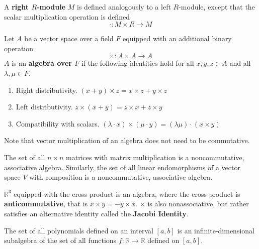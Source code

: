   \begin{definition}
    A \textbf{right $R$-module} $M$ is defined analogously to a left $R$-module, except that the scalar multiplication operation is defined
    \begin{equation}
      \cdot: M \times R \longrightarrow M
    \end{equation}
  \end{definition}

  \begin{definition}
    Let $A$ be a vector space over a field $F$ equipped with an additional binary operation 
    \begin{equation}
      \times: A \times A \longrightarrow A
    \end{equation}
    $A$ is an \textbf{algebra over $F$} if the following identities hold for all $x, y, z \in A$ and all $\lambda, \mu \in F$. 
    \begin{enumerate}
      \item Right distributivity. $(x + y) \times z = x \times z + y \times z$ 
      \item Left distributivity. $z \times (x + y) = z \times x + z \times y$
      \item Compatibility with scalars. $(\lambda \cdot x ) \times (\mu \cdot y) = (\lambda \mu) \cdot (x \times y)$ 
    \end{enumerate}
  \end{definition}

  Note that vector multiplication of an algebra does not need to be commutative. 

  \begin{example}
    The set of all $n \times n$ matrices with matrix multiplication is a noncommutative, associative algebra. Similarly, the set of all linear endomorphisms of a vector space $V$ with composition is a noncommutative, associative algebra. 
  \end{example}

  \begin{example}
    $\mathbb{R}^3$ equipped with the cross product is an algebra, where the cross product is \textbf{anticommutative}, that is $x \times y = - y \times x$. $\times$ is also nonassociative, but rather satisfies an alternative identity called the \textbf{Jacobi Identity}. 
  \end{example}

  \begin{example}
    The set of all polynomials defined on an interval $[a,b]$ is an infinite-dimensional subalgebra of the set of all functions $f: \mathbb{R} \longrightarrow \mathbb{R}$ defined on $[a,b]$.
  \end{example}

